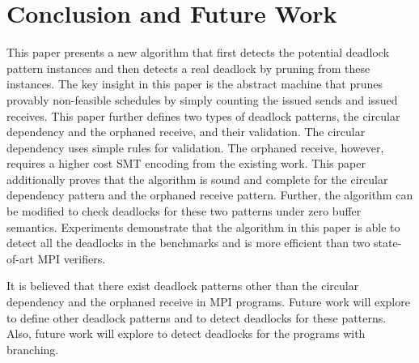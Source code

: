 \section{Conclusion and Future Work}
This paper presents a new algorithm that first detects the potential deadlock pattern instances and then detects a real deadlock by pruning from these instances.
The key insight in this paper is the abstract machine that prunes provably non-feasible schedules by simply counting the issued sends and issued receives. 
This paper further defines two types of deadlock patterns, the circular dependency and the orphaned receive, and their validation. The circular dependency uses simple rules for validation. The orphaned receive, however, requires a higher cost SMT encoding from the existing work. This paper additionally proves that the algorithm is sound and complete for the circular dependency pattern and the orphaned receive pattern.
Further, the algorithm can be modified to check deadlocks for these two patterns under zero buffer semantics. Experiments demonstrate that the algorithm in this paper is able to detect all the deadlocks in the benchmarks and is more efficient than two state-of-art MPI verifiers.

It is believed that there exist deadlock patterns other than the circular dependency and the orphaned receive in MPI programs.
Future work will explore to define other deadlock patterns and to detect deadlocks for these patterns. Also, future work will explore to detect deadlocks for the programs with branching. 

\newpage